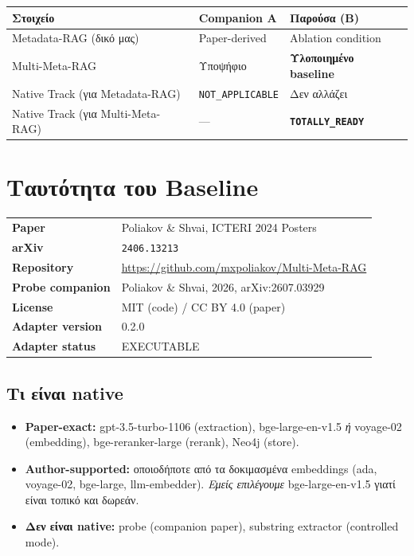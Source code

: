\documentclass[11pt,a4paper]{article}
\begin{document}
\begin{center}
\small
\begin{tabular}{@{}p{4cm}p{4cm}p{5cm}@{}}
\toprule
\textbf{Στοιχείο} & \textbf{Companion A} & \textbf{Παρούσα (B)} \\
\midrule
Metadata-RAG (δικό μας) & Paper-derived & Ablation condition \\
Multi-Meta-RAG & Υποψήφιο & \textbf{Υλοποιημένο baseline} \\
Native Track (για Metadata-RAG) & \texttt{NOT\_APPLICABLE} & Δεν αλλάζει \\
Native Track (για Multi-Meta-RAG) & --- & \textbf{\texttt{TOTALLY\_READY}} \\
\bottomrule
\end{tabular}
\end{center}

\section{Ταυτότητα του Baseline}

\begin{center}
\small
\begin{tabular}{@{}ll@{}}
\toprule
\textbf{Paper} & Poliakov \& Shvai, ICTERI 2024 Posters \\
\textbf{arXiv} & \texttt{2406.13213} \\
\textbf{Repository} & \url{https://github.com/mxpoliakov/Multi-Meta-RAG} \\
\textbf{Probe companion} & Poliakov \& Shvai, 2026, arXiv:2607.03929 \\
\textbf{License} & MIT (code) / CC BY 4.0 (paper) \\
\textbf{Adapter version} & 0.2.0 \\
\textbf{Adapter status} & EXECUTABLE \\
\bottomrule
\end{tabular}
\end{center}

\subsection*{Τι είναι native}

\begin{itemize}[leftmargin=1.5em,itemsep=0.1em]
  \item \textbf{Paper-exact:} gpt-3.5-turbo-1106 (extraction),
        bge-large-en-v1.5 \emph{ή} voyage-02 (embedding),
        bge-reranker-large (rerank), Neo4j (store).
  \item \textbf{Author-supported:} οποιοδήποτε από τα δοκιμασμένα
        embeddings (ada, voyage-02, bge-large, llm-embedder).
        \emph{Εμείς επιλέγουμε} bge-large-en-v1.5 γιατί είναι τοπικό
        και δωρεάν.
  \item \textbf{Δεν είναι native:} probe (companion paper), substring
        extractor (controlled mode).
\end{itemize}
\end{document}
